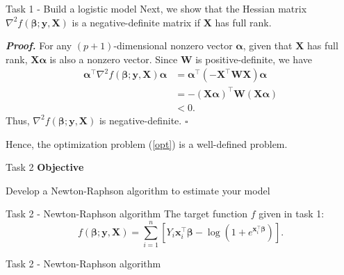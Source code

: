 \documentclass[
  ignorenonframetext,
]{beamer}
\begin{document}
\begin{frame}{Task 1 - Build a logistic model}
\protect\hypertarget{task-1---build-a-logistic-model-5}{}
Next, we show that the Hessian matrix
\(\nabla^2 f(\boldsymbol{\beta};\mathbf{y},\mathbf{X})\) is a
negative-definite matrix if \(\mathbf{X}\) has full rank.

\textbf{\emph{Proof.}} For any \((p+1)\)-dimensional nonzero vector
\(\boldsymbol{\alpha}\), given that \(\mathbf{X}\) has full rank,
\(\mathbf{X}\boldsymbol{\alpha}\) is also a nonzero vector. Since
\(\mathbf{W}\) is positive-definite, we have \begin{align*}
\boldsymbol{\alpha}^\top\nabla^2 f(\boldsymbol{\beta};\mathbf{y},\mathbf{X})\boldsymbol{\alpha}&=\boldsymbol{\alpha}^\top(-\mathbf{X}^\top\mathbf{W}\mathbf{X})\boldsymbol{\alpha}\\
&=-(\mathbf{X}\boldsymbol{\alpha})^\top\mathbf{W}(\mathbf{X}\boldsymbol{\alpha})\\
&<0.
\end{align*} Thus,
\(\nabla^2 f(\boldsymbol{\beta};\mathbf{y},\mathbf{X})\) is
negative-definite. \hfill\(\square\)

Hence, the optimization problem (\ref{opt}) is a well-defined problem.
\end{frame}

\begin{frame}{Task 2}
\protect\hypertarget{task-2}{}
\textbf{Objective}

Develop a Newton-Raphson algorithm to estimate your model
\end{frame}

\begin{frame}{Task 2 - Newton-Raphson algorithm}
\protect\hypertarget{task-2---newton-raphson-algorithm}{}
The target function \(f\) given in task 1: \begin{equation}\label{func}
f(\boldsymbol{\beta};\mathbf{y},\mathbf{X})=\sum_{i=1}^n\left[Y_i\mathbf{x}_i^\top\boldsymbol{\beta}-\log\left(1+e^{\mathbf{x}_i^\top\boldsymbol{\beta}}\right)\right].
\end{equation}
\end{frame}

\begin{frame}{Task 2 - Newton-Raphson algorithm}
\protect\hypertarget{task-2---newton-raphson-algorithm-1}{}
\end{frame}
\end{document}
